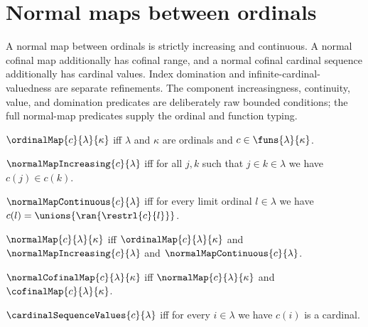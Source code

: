 \section{Normal maps between ordinals}



A normal map between ordinals is strictly increasing and continuous.  A
normal cofinal map additionally has cofinal range, and a normal cofinal
cardinal sequence additionally has cardinal values.  Index domination and
infinite-cardinal-valuedness are separate refinements. The component
increasingness, continuity, value, and domination predicates are deliberately
raw bounded conditions; the full normal-map predicates supply the ordinal and
function typing.

\begin{definition}\label{ordinal_map}
    $\ordinalMap{c}{\lambda}{\kappa}$ iff
        $\lambda$ and $\kappa$ are ordinals and
        $c\in\funs{\lambda}{\kappa}$.
\end{definition}

\begin{definition}\label{normal_map_increasing}
    $\normalMapIncreasing{c}{\lambda}$ iff
        for all $j,k$ such that $j\in k\in\lambda$ we have $c(j)\in c(k)$.
\end{definition}

\begin{definition}\label{normal_map_continuous}
    $\normalMapContinuous{c}{\lambda}$ iff
        for every limit ordinal $l\in\lambda$ we have
            $c(l)=\unions{\ran{\restrl{c}{l}}}$.
\end{definition}

\begin{definition}\label{normal_map}
    $\normalMap{c}{\lambda}{\kappa}$ iff
        $\ordinalMap{c}{\lambda}{\kappa}$ and
        $\normalMapIncreasing{c}{\lambda}$ and
        $\normalMapContinuous{c}{\lambda}$.
\end{definition}

\begin{definition}\label{normal_cofinal_map}
    $\normalCofinalMap{c}{\lambda}{\kappa}$ iff
        $\normalMap{c}{\lambda}{\kappa}$ and
        $\cofinalMap{c}{\lambda}{\kappa}$.
\end{definition}

\begin{definition}\label{cardinal_sequence_values}
    $\cardinalSequenceValues{c}{\lambda}$ iff
        for every $i\in\lambda$ we have $c(i)$ is a cardinal.
\end{definition}


